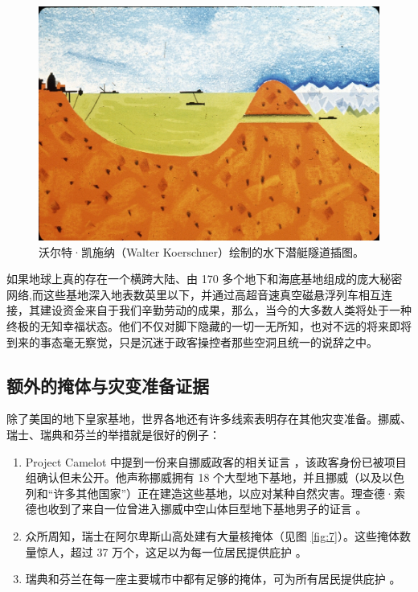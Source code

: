 \documentclass[10pt,twocolumn,letterpaper]{article}
\begin{document}
\begin{figure}[t]
\begin{center}
   \includegraphics[width=1\linewidth]{sub.jpg}
\end{center}
   \caption{沃尔特·凯施纳（Walter Koerschner）绘制的水下潜艇隧道插图\cite{22,23}。}
\label{fig:6}
\label{fig:onecol}
\end{figure}
如果地球上真的存在一个横跨大陆、由 170 多个地下和海底基地组成的庞大秘密网络,而这些基地深入地表数英里以下，并通过高超音速真空磁悬浮列车相互连接，其建设资金来自于我们辛勤劳动的成果，那么，当今的大多数人类将处于一种终极的无知幸福状态。他们不仅对脚下隐藏的一切一无所知，也对不远的将来即将到来的事态毫无察觉，只是沉迷于政客操控者那些空洞且统一的说辞之中。

\subsection{额外的掩体与灾变准备证据}

除了美国的地下皇家基地，世界各地还有许多线索表明存在其他灾变准备。挪威、瑞士、瑞典和芬兰的举措就是很好的例子：

\begin{flushleft}
\begin{enumerate}
    \item Project Camelot 中提到一份来自挪威政客的相关证言 \cite{25,26}，该政客身份已被项目组确认但未公开。他声称挪威拥有 18 个大型地下基地，并且挪威（以及以色列和“许多其他国家”）正在建造这些基地，以应对某种自然灾害。理查德·索德也收到了来自一位曾进入挪威中空山体巨型地下基地男子的证言 \cite{22}。
    \item 众所周知，瑞士在阿尔卑斯山高处建有大量核掩体（见图 \ref{fig:7}）。这些掩体数量惊人，超过 37 万个，这足以为每一位居民提供庇护 \cite{27}。
    \item 瑞典和芬兰在每一座主要城市中都有足够的掩体，可为所有居民提供庇护 \cite{27}。
\end{enumerate}
\end{flushleft}
\end{document}
